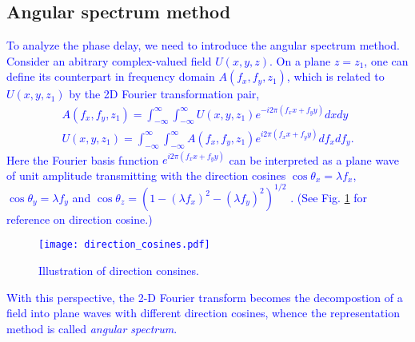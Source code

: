 \subsection{Angular spectrum method}
\textcolor{blue}{
To analyze the phase delay, we need to introduce the angular spectrum method. Consider an abitrary complex-valued field $U(x, y, z)$. On a plane $z = z_1$, one can define its counterpart in frequency domain $A(f_x, f_y, z_1)$, which is related to $U(x, y, z_1)$ by the 2D Fourier transformation pair,
\begin{eqnarray}
	A(f_x, f_y, z_1) = \int_{-\infty}^{\infty} \int_{-\infty}^{\infty} U(x, y, z_1)
	e^{-i 2 \pi (f_x x + f_y y)} dx dy
	\nonumber\\
	U(x, y, z_1) = \int_{-\infty}^{\infty} \int_{-\infty}^{\infty} A(f_x, f_y, z_1)
	e^{i 2 \pi (f_x x + f_y y)} df_x df_y.
	\nonumber
\end{eqnarray}
Here the Fourier basis function $e^{i2\pi (f_x x + f_y y)}$ can be interpreted as a plane wave of unit amplitude transmitting with the direction cosines $\cos\theta_x = \lambda f_x$, $\cos\theta_y = \lambda f_y$ and $\cos\theta_z = (1 - (\lambda f_x)^2 - (\lambda f_y)^2)^{1/2}$ \cite{Fo04}. (See Fig. \ref{fig:dirc_cos} for reference on direction cosine.)
\begin{figure}
	\centering
	\texttt{[image: direction\_cosines.pdf]}
	\caption{Illustration of direction consines.}
	\label{fig:dirc_cos}
\end{figure}
With this perspective, the 2-D Fourier transform becomes the decompostion of a field into plane waves with different direction cosines, whence the representation method is called {\em angular spectrum}.
}


